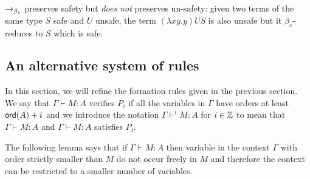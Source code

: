 \begin{rem}
\label{rem:betasred_notpreserv_unsafety} $\rightarrow_{\beta_s}$ preserves
safety but \emph{does not} preserves un-safety: given two terms of
the same type $S$ safe and $U$ unsafe, the term $(\lambda x y . y) U S$ is also unsafe
but it $\beta_s$-reduces to $S$ which is safe.
\end{rem}


\subsection{An alternative system of rules}


In this section, we will refine the formation rules
given in the previous section. We say that $\Gamma \vdash M : A$ verifies $P_i$ if all the
variables in $\Gamma$ have orders at least ${\sf ord}(A)+i$ and we introduce the notation $\Gamma \vdash^{i} M : A$ for $i \in
\mathbb{Z}$ to mean that $\Gamma \vdash M : A$ and $\Gamma \vdash M : A$
satisfies $P_i$.


The following lemma says that if $\Gamma \vdash M : A$ then variable in the context $\Gamma$ with order
strictly smaller than $M$ do not occur freely in $M$ and therefore the context can be restricted to a smaller number of variables.

